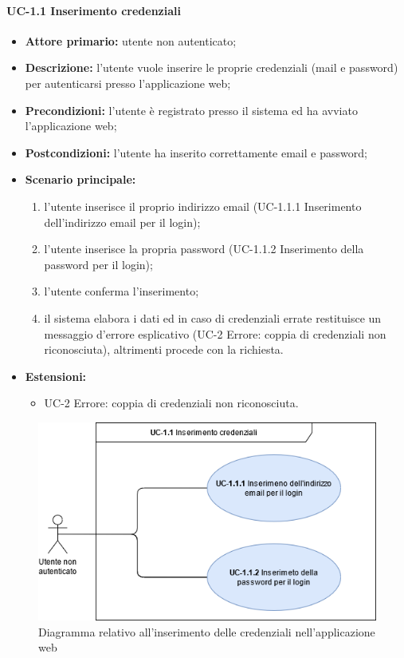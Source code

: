   \paragraph{UC-1.1 Inserimento credenziali}
  \begin{itemize}
    \item \textbf{Attore primario:} utente non autenticato;
  
    \item \textbf{Descrizione:} l'utente vuole inserire le proprie credenziali (mail e password) per autenticarsi presso l'applicazione web;
  
    \item \textbf{Precondizioni:} l'utente è registrato presso il sistema ed ha avviato l'applicazione web;
  
    \item \textbf{Postcondizioni:} l'utente ha inserito correttamente email e password;
  
    \item \textbf{Scenario principale:}
          \begin{enumerate}
            \item l'utente inserisce il proprio indirizzo email (UC-1.1.1 Inserimento dell'indirizzo email per il login);
            \item l'utente inserisce la propria password (UC-1.1.2 Inserimento della password per il login);
            \item l'utente conferma l'inserimento;
            \item il sistema elabora i dati ed in caso di credenziali errate restituisce un messaggio d'errore esplicativo (UC-2 Errore: coppia di credenziali non riconosciuta), altrimenti procede con la richiesta.
          \end{enumerate}
    \item \textbf{Estensioni:}
      \begin{itemize}
            \item UC-2 Errore: coppia di credenziali non riconosciuta.
          \end{itemize}
  \end{itemize}
  
\begin{figure}[H]
    \centering
      \includegraphics[scale=0.50]{src/CasiDUso/immagini/InserimentoCredenzialiWeb.png}
    \caption{Diagramma relativo all'inserimento delle credenziali nell'applicazione web}
\end{figure}
  
